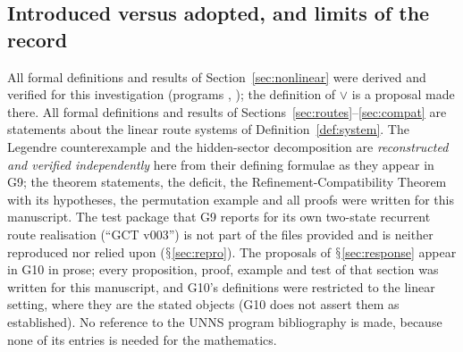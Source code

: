 \documentclass[11pt,a4paper]{article}
\renewcommand{\S}{\ensuremath{\mathsection}}
\newcommand{\vj}{\mathbin{\vee}}
\theoremstyle{plain}
\theoremstyle{definition}
\begin{document}
\subsection{Introduced versus adopted, and limits of the record}
All formal definitions and results of Section~\ref{sec:nonlinear} were derived and verified for this investigation (programs , ); the definition of $\vj$ is a proposal made there. All formal definitions and results of Sections~\ref{sec:routes}--\ref{sec:compat} are statements about the linear route systems of Definition~\ref{def:system}. The Legendre counterexample and the hidden-sector decomposition are \emph{reconstructed and verified independently} here from their defining formulae as they appear in G9; the theorem statements, the deficit, the Refinement-Compatibility Theorem with its hypotheses, the permutation example and all proofs were written for this manuscript. The test package that G9 reports for its own two-state recurrent route realisation (``GCT v003'') is not part of the files provided and is neither reproduced nor relied upon (\S\ref{sec:repro}). The proposals of \S\ref{sec:response} appear in G10 in prose; every proposition, proof, example and test of that section was written for this manuscript, and G10's definitions were restricted to the linear setting, where they are the stated objects (G10 does not assert them as established). No reference to the UNNS program bibliography is made, because none of its entries is needed for the mathematics.
\end{document}
